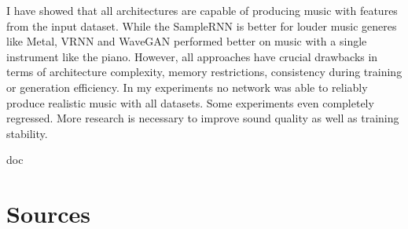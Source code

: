 \documentclass[12pt]{article}
\begin{document}
I have showed that all architectures are capable of producing music with features from the input dataset.
While the SampleRNN is better for louder music generes like Metal, VRNN and WaveGAN performed better on music with a single instrument like the piano.
However, all approaches have crucial drawbacks in terms of architecture complexity, memory restrictions, consistency during training or generation efficiency.
In my experiments no network was able to reliably produce realistic music with all datasets.
Some experiments even completely regressed.
More research is necessary to improve sound quality as well as training stability.









\newpage


\begin{btSect}{doc} %
\section*{Sources}
\btPrintCited
\end{btSect}
\end{document}
